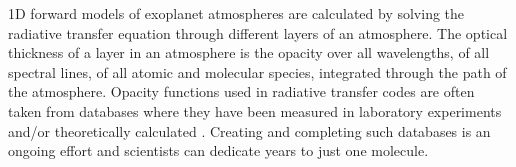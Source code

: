 1D forward models of exoplanet atmospheres are calculated by solving the radiative transfer equation through different layers of an atmosphere. The optical thickness of a layer in an atmosphere is the opacity over all wavelengths, of all spectral lines, of all atomic and molecular species, integrated through the path of the atmosphere. Opacity functions used in radiative transfer codes are often taken from databases where they have been measured in laboratory experiments and/or theoretically calculated \citep[e.g., HITRAN, ExoMol;][]{Rothman2010, Freedman2008, Freedman2014}. Creating and completing such databases is an ongoing effort and scientists can dedicate years to just one molecule.




